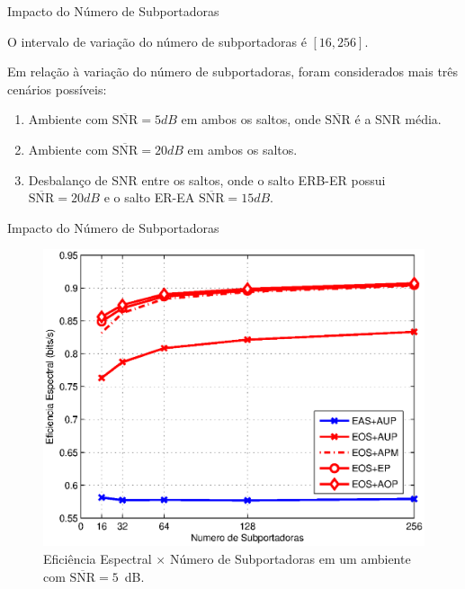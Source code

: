 \begin{frame}{Impacto do Número de Subportadoras}
   \begin{bigitem}
      \item O intervalo de variação do número de subportadoras é $[16,256]$.
      \item Em relação à variação do número de subportadoras, foram considerados mais três cenários possíveis:
      \begin{enumerate}[\noindent i)]
         \item Ambiente com $\overline{\text{SNR}} = 5dB$ em ambos os saltos, onde $\overline{\text{SNR}}$ é a SNR média.
         \item Ambiente com $\overline{\text{SNR}} = 20dB$ em ambos os saltos.
         \item Desbalanço de SNR entre os saltos, onde o salto ERB-ER possui $\overline{\text{SNR}} = 20dB$ e o salto ER-EA $\overline{\text{SNR}} = 15dB$.
      \end{enumerate}
   \end{bigitem}
\end{frame}

\begin{frame}{Impacto do Número de Subportadoras}
   \begin{figure}[!htb]
     \centering
     \includegraphics[width=0.6\linewidth]{../Imagens/SNxSE-5dB.eps}
     \caption{Eficiência Espectral $\times$ Número de Subportadoras em um ambiente com $\overline{\text{SNR}} = 5$~dB.}\label{fig:SNxSE-5dB}
   \end{figure}
\end{frame}

